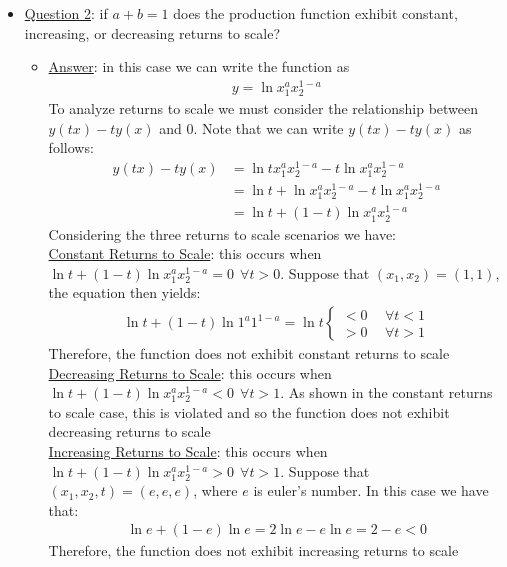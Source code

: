 \documentclass{article}
\begin{document}
  \begin{itemize}
    \item  \underline{Question 2}: if $a + b = 1$ does the production function exhibit constant, increasing, or decreasing returns to scale?
    \begin{itemize}
      \item  \underline{Answer}: in this case we can write the function as
      \begin{gather*}
        y = \ln x_{1}^{a}x_{2}^{1-a}
      \end{gather*}
      To analyze returns to scale we must consider the relationship between $y(tx) - ty(x)$ and 0. Note that we can write $y(tx) - ty(x)$ as follows:
      \begin{align*}
        y(tx) - ty(x) &= \ln tx_{1}^{a}x_{2}^{1-a} - t \ln x_{1}^{a}x_{2}^{1-a} \\
        &= \ln t + \ln x_{1}^{a}x_{2}^{1-a} - t \ln x_{1}^{a}x_{2}^{1-a} \\
        &= \ln t + (1-t) \ln x_{1}^{a} x_{2}^{1-a}
      \end{align*}
      Considering the three returns to scale scenarios we have: \\
      \underline{Constant Returns to Scale}: this occurs when $\ln t + (1-t) \ln x_{1}^{a}x_{2}^{1-a} = 0 \ \ \forall t>0$. Suppose that $(x_{1},x_{2}) = (1,1)$, the equation then yields:
      \begin{gather*}
        \ln t + (1-t) \ln 1^{a}1^{1-a} = \ln t
        \begin{cases}
          < 0 & \ \ \forall t < 1 \\
          > 0 & \ \ \forall t > 1
        \end{cases}
      \end{gather*}
      Therefore, the function does not exhibit constant returns to scale \\
      \underline{Decreasing Returns to Scale}: this occurs when $\ln t + (1-t) \ln x_{1}^{a}x_{2}^{1-a} < 0 \ \ \forall t>1$. As shown in the constant returns to scale case, this is violated and so the function does not exhibit decreasing returns to scale \\
      \underline{Increasing Returns to Scale}: this occurs when $\ln t + (1-t) \ln x_{1}^{a}x_{2}^{1-a} > 0 \ \ \forall t > 1$. Suppose that $(x_{1}, x_{2}, t) = (e,e,e)$, where $e$ is euler's number. In this case we have that:
      \begin{gather*}
        \ln e + (1-e)\ln e = 2 \ln e - e \ln e = 2 - e < 0
      \end{gather*}
      Therefore, the function does not exhibit increasing returns to scale
    \end{itemize}
  \end{itemize}
\end{document}
